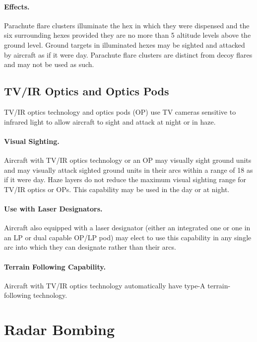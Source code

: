 \begin{advancedrules}
{\paragraph{Effects.} 
Parachute flare clusters illuminate the hex in which they were dispensed and the six surrounding hexes provided they are no more than 5 altitude levels above the ground level. Ground targets in illuminated hexes may be sighted and attacked by aircraft as if it were day. Parachute flare clusters are distinct from decoy flares and may not be used as such.

\subsection{TV/IR Optics and Optics Pods}

TV/IR optics technology and optics pods (OP) use TV cameras sensitive to infrared light to allow aircraft to sight and attack at night or in haze.

\paragraph{Visual Sighting.} Aircraft with TV/IR optics technology or an OP may visually sight ground units and may visually attack sighted ground units in their  arcs within a range of 18 as if it were day. Haze layers do not reduce the maximum visual sighting range for TV/IR optics or OPs. This capability may be used in the day or at night. 

\paragraph{Use with Laser Designators.} Aircraft also equipped with a laser designator (either an integrated one or one in an LP or dual capable OP/LP pod) may elect to use this capability in any single arc into which they can designate rather than their  arcs.

\paragraph{Terrain Following Capability.} Aircraft with TV/IR optics technology automatically have type-A terrain-following technology.

\section{Radar Bombing}

}
\end{advancedrules}
